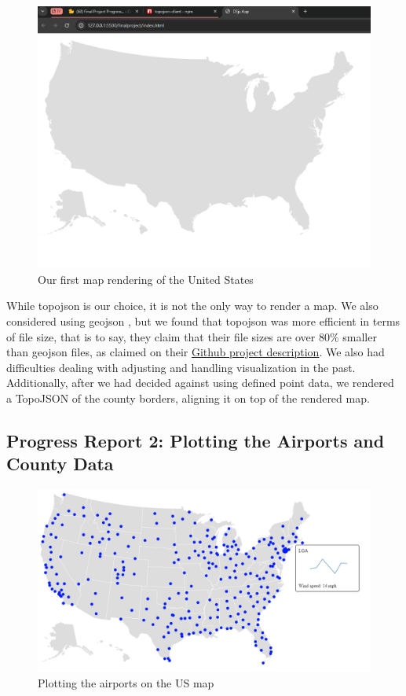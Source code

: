 \documentclass[10pt,twocolumn,twoside]{opticajnl}
\begin{document}
\begin{figure}
    \centering
    \includegraphics[scale=0.25]{images/img1.png}
    \caption{Our first map rendering of the United States}
\end{figure}

While topojson is our choice, it is not the only way to render a map. We also considered using geojson \cite{mapbox_geojsonio}, but we found that topojson was more efficient in terms of file size, that is to say, they claim that their file sizes are over 80\% smaller than geojson files, as claimed on their \href{https://github.com/topojson/topojson}{Github project description}. We also had difficulties dealing with adjusting and handling visualization in the past. Additionally, after we had decided against using defined point data, we rendered a TopoJSON of the county borders, aligning it on top of the rendered map.

\subsection{Progress Report 2: Plotting the Airports and County Data}

\begin{figure}
    \centering
    \includegraphics[scale=0.25]{images/img2.png}
    \caption{Plotting the airports on the US map}
\end{figure}
\end{document}
